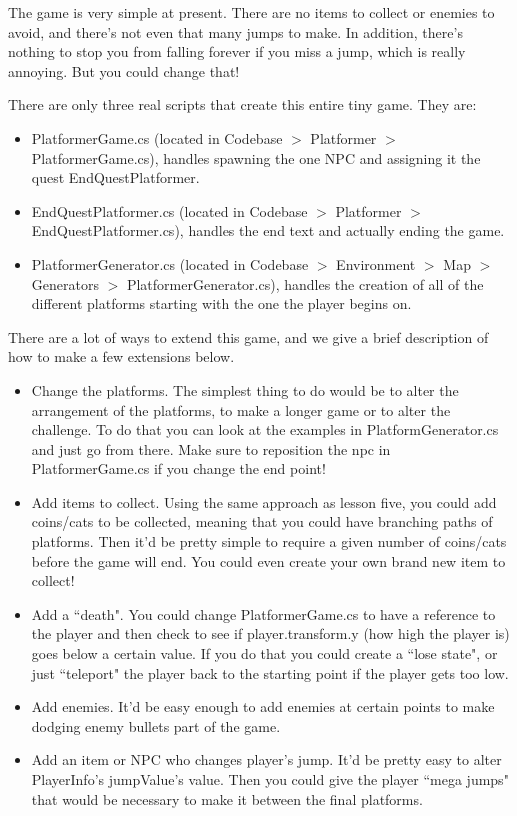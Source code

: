 \documentclass{article}
\begin{document}
The game is very simple at present. There are no items to collect or enemies to avoid, and there's not even that many jumps to make. In addition, there's nothing to stop you from falling forever if you miss a jump, which is really annoying. But you could change that! 

There are only three real scripts that create this entire tiny game. They are: 
\begin{itemize}
\item PlatformerGame.cs (located in Codebase $>$ Platformer $>$ PlatformerGame.cs), handles spawning the one NPC and assigning it the quest EndQuestPlatformer.
\item EndQuestPlatformer.cs (located in Codebase $>$ Platformer $>$ EndQuestPlatformer.cs), handles the end text and actually ending the game.
\item PlatformerGenerator.cs (located in Codebase $>$ Environment $>$ Map $>$ Generators $>$ PlatformerGenerator.cs), handles the creation of all of the different platforms starting with the one the player begins on.
\end{itemize}

There are a lot of ways to extend this game, and we give a brief description of how to make a few extensions below. 

\begin{itemize}
\item Change the platforms. The simplest thing to do would be to alter the arrangement of the platforms, to make a longer game or to alter the challenge. To do that you can look at the examples in PlatformGenerator.cs and just go from there. Make sure to reposition the npc in PlatformerGame.cs if you change the end point!
\item Add items to collect. Using the same approach as lesson five, you could add coins/cats to be collected, meaning that you could have branching paths of platforms. Then it'd be pretty simple to require a given number of coins/cats before the game will end. You could even create your own brand new item to collect!
\item Add a ``death". You could change PlatformerGame.cs to have a reference to the player and then check to see if player.transform.y (how high the player is) goes below a certain value. If you do that you could create a ``lose state", or just ``teleport" the player back to the starting point if the player gets too low. 
\item Add enemies. It'd be easy enough to add enemies at certain points to make dodging enemy bullets part of the game. 
\item Add an item or NPC who changes player's jump. It'd be pretty easy to alter PlayerInfo's jumpValue's value. Then you could give the player ``mega jumps" that would be necessary to make it between the final platforms.
\end{itemize}
\end{document}
